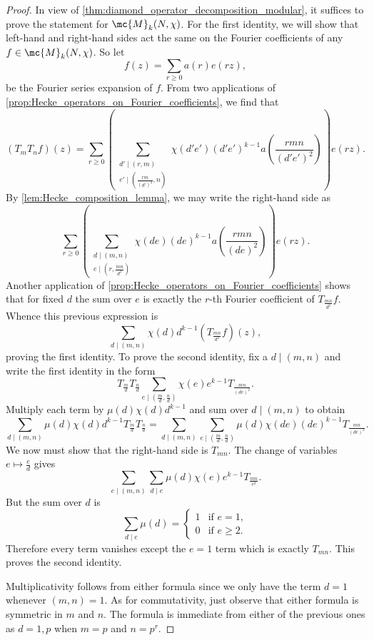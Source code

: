 \documentclass[12pt]{article}
\begin{document}
      \begin{proof}
        In view of \cref{thm:diamond_operator_decomposition_modular}, it suffices to prove the statement for \(\mc{M}_{k}(N,\chi)\). For the first identity, we will show that left-hand and right-hand sides act the same on the Fourier coefficients of any \(f \in \mc{M}_{k}(N,\chi)\). So let
        \[
          f(z) = \sum_{r \ge 0}a(r)e(r z),
        \]
        be the Fourier series expansion of \(f\). From two applications of \cref{prop:Hecke_operators_on_Fourier_coefficients}, we find that
        \[
          (T_{m}T_{n}f)(z) = \sum_{r \ge 0}\left(\sum_{\substack{d' \mid (r,m) \\ e' \mid \left(\frac{rm}{(d')^{2}},n\right)}}\chi(d'e')(d'e')^{k-1}a\left(\frac{rmn}{(d'e')^{2}}\right)\right)e(rz).
        \]
        By \cref{lem:Hecke_composition_lemma}, we may write the right-hand side as
        \[
          \sum_{r \ge 0}\left(\sum_{\substack{d \mid (m,n) \\ e \mid \left(r,\frac{mn}{d^{2}}\right)}}\chi(de)(de)^{k-1}a\left(\frac{rmn}{(de)^{2}}\right)\right)e(rz).
        \]
        Another application of \cref{prop:Hecke_operators_on_Fourier_coefficients} shows that for fixed \(d\) the sum over \(e\) is exactly the \(r\)-th Fourier coefficient of \(T_{\frac{mn}{d^{2}}}f\). Whence this previous expression is
        \[
          \sum_{d \mid (m,n)}\chi(d)d^{k-1}\left(T_{\frac{mn}{d^{2}}}f\right)(z),
        \]
        proving the first identity. To prove the second identity, fix a \(d \mid (m,n)\) and write the first identity in the form
        \[
          T_{\frac{m}{d}}T_{\frac{n}{d}}\sum_{e \mid \left(\frac{m}{d},\frac{n}{d}\right)}\chi(e)e^{k-1}T_{\frac{mn}{(de)^{2}}}.
        \]
        Multiply each term by \(\mu(d)\chi(d)d^{k-1}\) and sum over \(d \mid (m,n)\) to obtain
        \[
          \sum_{d \mid (m,n)}\mu(d)\chi(d)d^{k-1}T_{\frac{m}{d}}T_{\frac{n}{d}} = \sum_{d \mid (m,n)}\sum_{e \mid \left(\frac{m}{d},\frac{n}{d}\right)}\mu(d)\chi(de)(de)^{k-1}T_{\frac{mn}{(de)^{2}}}.
        \]
        We now must show that the right-hand side is \(T_{mn}\). The change of variables \(e \mapsto \frac{e}{d}\) gives
        \[
          \sum_{e \mid (m,n)}\sum_{d \mid e}\mu(d)\chi(e)e^{k-1}T_{\frac{mn}{e^{2}}}.
        \]
        But the sum over \(d\) is
        \[
          \sum_{d \mid e}\mu(d) = \begin{cases} 1 & \text{if \(e = 1\)}, \\ 0 & \text{if \(e \ge 2\)}. \end{cases}
        \]
        Therefore every term vanishes except the \(e = 1\) term which is exactly \(T_{mn}\). This proves the second identity.
        
        Multiplicativity follows from either formula since we only have the term \(d = 1\) whenever \((m,n) = 1\). As for commutativity, just observe that either formula is symmetric in \(m\) and \(n\). The formula is immediate from either of the previous ones as \(d = 1,p\) when \(m = p\) and \(n = p^{r}\).
      \end{proof}
\end{document}
